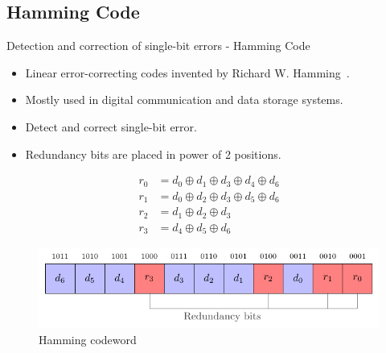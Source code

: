 \subsection{Hamming Code}
    \begin{frame}{Detection and correction of single-bit errors - Hamming Code}
        \begin{block}{}
            \begin{itemize}
                \justifying
                \item Linear error-correcting codes invented by Richard W. Hamming~\cite{H-50-bstj}.
                \item Mostly used in digital communication and data storage systems.
                \item Detect and correct single-bit error.
                \item Redundancy bits are placed in power of 2 positions.
            \end{itemize}
        \end{block}

        \begin{minipage}[c]{0.4\linewidth}
            \begin{equation} \label{equat:hamming_encoder}
                \begin{split}
                    r_{0} &= d_{0} \oplus d_{1} \oplus d_{3} \oplus d_{4} \oplus d_{6} \\
                    r_{1} &= d_{0} \oplus d_{2} \oplus d_{3} \oplus d_{5} \oplus d_{6} \\
                    r_{2} &= d_{1} \oplus d_{2} \oplus d_{3} \\
                    r_{3} &= d_{4} \oplus d_{5} \oplus d_{6}
                \end{split}
            \end{equation}
        \end{minipage}\hfill%
        \begin{minipage}[c]{0.55\linewidth}
            \begin{figure}
                \centering
                \includegraphics[width=\textwidth, page=1]{src/4_strategies/img/hamming_bit.pdf}
                \caption{Hamming codeword}
                \label{fig:hamming_codeword}
            \end{figure}
        \end{minipage}
    \end{frame}
